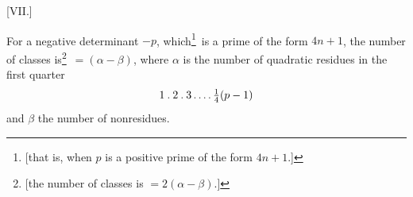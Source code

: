 \par\bigskip{}\centerline{[VII.]}\medskip
For a negative determinant $-p$, which\begingroup\renewcommand{\thefootnote}{***)}\footnote{[that is, when $p$ is a positive prime of the form $4n+1$.]}\endgroup\ is a prime of the form $4n+1$, the number of classes is\begingroup\renewcommand{\thefootnote}{$\dagger$)}\footnote{[the number of classes is $=2(\alpha-\beta)$.]}\endgroup\ $=(\alpha-\beta)$, where $\alpha$ is the number of quadratic residues in the first quarter
\[
1\mathbin{.}2\mathbin{.}3\mathinner{.\,.\,.\,.}\tfrac14(p-1)
\]
and $\beta$ the number of nonresidues.
